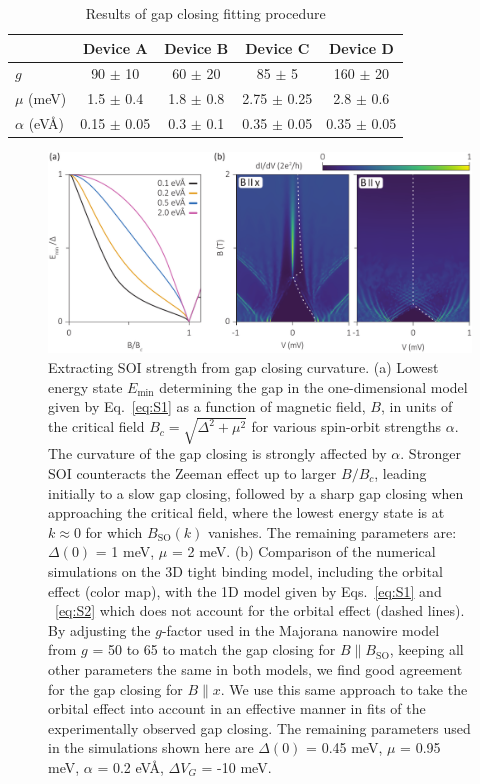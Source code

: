 \begin{table}[h]
\label{tab:AlphaFit}
\caption{Results of gap closing fitting procedure}
\begin{tabular}{l|cccc}
& Device A & Device B & Device C & Device D \\
\hline
$g$ & 90 $\pm$ 10 & 60 $\pm$ 20 & 85 $\pm$ 5 & 160 $\pm$ 20\\
$\mu$ (meV) & 1.5 $\pm$ 0.4 & 1.8 $\pm$ 0.8 & 2.75 $\pm$ 0.25 & 2.8 $\pm$ 0.6\\
$\alpha$ (eV\AA) & 0.15 $\pm$ 0.05 & 0.3 $\pm$ 0.1 & 0.35 $\pm$ 0.05 & 0.35 $\pm$ 0.05\\
\end{tabular}
\end{table}

\begin{figure}
\begin{center}
\centering
\includegraphics[width=\columnwidth]{chapter_spinorbit/figures/SFig7_AlphaFitting.pdf}
\caption{\label{fig:SOIFit}
Extracting SOI strength from gap closing curvature.
(a) Lowest energy state $E_{\mathrm{min}}$ determining the gap in the one-dimensional model given by Eq.~\eqref{eq:S1} as a function of magnetic field, $B$, in units of the critical field $B_c=\sqrt{\Delta^2+\mu^2}$ for various spin-orbit strengths $\alpha$.
The curvature of the gap closing is strongly affected by $\alpha$.
Stronger SOI counteracts the Zeeman effect up to larger $B/B_c$, leading initially to a slow gap closing, followed by a sharp gap closing when approaching the critical field, where the lowest energy state is at $k \approx 0$ for which $B_{\mathrm{SO}}(k)$ vanishes.
The remaining parameters are: $\Delta(0)$ = 1 meV, $\mu$ = 2 meV.
(b) Comparison of the numerical simulations on the 3D tight binding model, including the orbital effect (color map), with the 1D model given by Eqs.~\eqref{eq:S1} and ~\eqref{eq:S2} which does not account for the orbital effect (dashed lines).
By adjusting the $g$-factor used in the Majorana nanowire model from $g$ = 50 to 65 to match the gap closing for $B \parallel B_{\mathrm{SO}}$, keeping all other parameters the same in both models, we find good agreement for the gap closing for $B \parallel x$.
We use this same approach to take the orbital effect into account in an effective manner in fits of the experimentally observed gap closing.
The remaining parameters used in the simulations shown here are $\Delta(0)$ = 0.45 meV, $\mu$ = 0.95 meV, $\alpha$ = 0.2 eV\AA, $\Delta V_G$ = -10 meV.
}
\end{center}
\end{figure}


